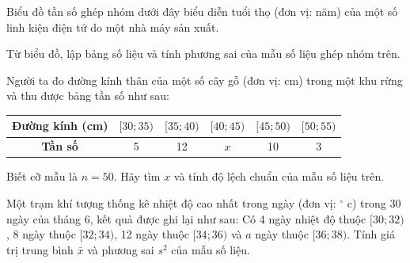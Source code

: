 \documentclass[12pt]{article}
\begin{document}
	\begin{btvang}[title={Bài 3}]
		Biểu đồ tần số ghép nhóm dưới đây biểu diễn tuổi thọ (đơn vị: năm) của một số linh kiện điện tử do một nhà máy sản xuất.
		\begin{center}
		\end{center}
		Từ biểu đồ, lập bảng số liệu và tính phương sai của mẫu số liệu ghép nhóm trên.
	\end{btvang}
	
	\begin{btvang}[title={Bài 4}]
		Người ta đo đường kính thân của một số cây gỗ (đơn vị: cm) trong một khu rừng và thu được bảng tần số như sau:
		\begin{center}
			\renewcommand{\arraystretch}{1.3}
			\begin{tabular}{|c|c|c|c|c|c|}
				\hline
				\textbf{Đường kính (cm)} & $[30; 35)$ & $[35; 40)$ & $[40; 45)$ & $[45; 50)$ & $[50; 55)$ \\
				\hline
				\textbf{Tần số} & 5 & 12 & $x$ & 10 & 3 \\
				\hline
			\end{tabular}
		\end{center}
		Biết cỡ mẫu là $n = 50$. Hãy tìm $x$ và tính độ lệch chuẩn của mẫu số liệu trên.
	\end{btvang}
	
	\begin{btdo}[title={Bài 5}]
		Một trạm khí tượng thống kê nhiệt độ cao nhất trong ngày (đơn vị: $^\circ$ c) trong 30 ngày của tháng 6, kết quả được ghi lại như sau: 
		Có 4 ngày nhiệt độ thuộc $[30; 32)$, 8 ngày thuộc $[32; 34)$, 12 ngày thuộc $[34; 36)$ và $a$ ngày thuộc $[36; 38)$. 
		Tính giá trị trung bình $\bar{x}$ và phương sai $s^2$ của mẫu số liệu.
	\end{btdo}
	
\end{document}
